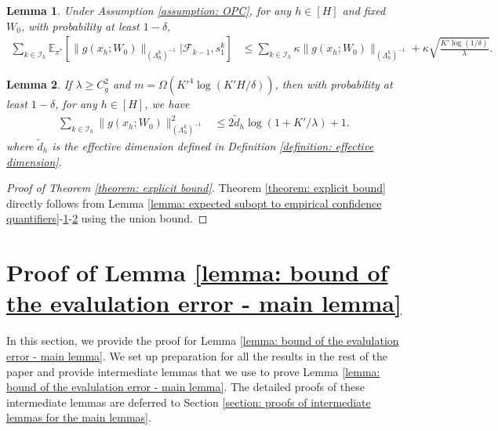 \documentclass{article} \usepackage{iclr2023/iclr2023_conference,times}
\newtheorem{lemma}{Lemma}[section]
\begin{document}
\begin{lemma}
Under Assumption \ref{assumption: OPC}, for any $h \in [H]$ and fixed $W_0$, with probability at least $1 - \delta$,
\begin{align*}
    \sum_{k \in \mathcal{I}_h} \mathbb{E}_{\pi^*} \left[ \| g(x_h; W_0) \|_{(\Lambda_h^k)^{-1}} \bigg| \mathcal{F}_{k-1}, s_1^k  \right] &\leq \sum_{k \in \mathcal{I}_h} \kappa \| g(x_h; W_0)  \|_{(\Lambda^k_h)^{-1}} + 
    \kappa \sqrt{\frac{K' \log(1/\delta)}{\lambda}}.
\end{align*}
\label{lemma:sum_sample_subopt}
\end{lemma}

\begin{lemma}
If $\lambda \geq C_g^2$ and $m = \Omega(K'^4 \log (K'H /\delta))$, then with probability at least $1 - \delta$, for any $h \in [H]$, we have 
\begin{align*}
     \sum_{k \in \mathcal{I}_h} \| g(x_h; W_0)  \|_{(\Lambda^k_h)^{-1}}^2 &\leq 2\tilde{d}_h \log(1 + K' / \lambda) + 1. 
\end{align*}
where $\tilde{d}_h$ is the effective dimension defined in Definition \ref{definition: effective dimension}. 
\label{lemma: bound the summation of the uncertainty quantifier}
\end{lemma}




\begin{proof}[Proof of Theorem \ref{theorem: explicit bound}]
Theorem \ref{theorem: explicit bound} directly follows from Lemma \ref{lemma: expected subopt to empirical confidence quantifiers}-\ref{lemma:sum_sample_subopt}-\ref{lemma: bound the summation of the uncertainty quantifier} using the union bound. 
\end{proof}
 \section{Proof of Lemma \ref{lemma: bound of the evalulation error - main lemma}}
\label{section: proof of main lemma about evaluation error}

In this section, we provide the proof for Lemma \ref{lemma: bound of the evalulation error - main lemma}. We set up preparation for all the results in the rest of the paper and provide intermediate lemmas that we use to prove Lemma \ref{lemma: bound of the evalulation error - main lemma}. The detailed proofs of these intermediate lemmas are deferred to Section \ref{section: proofs of intermediate lemmas for the main lemmas}. 
\end{document}
